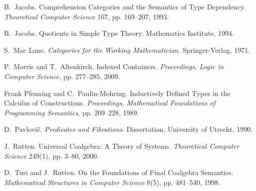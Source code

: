 \documentclass{LMCS}
\theoremstyle{plain}
\theoremstyle{remark}
\theoremstyle{definition}
\begin{document}
\begin{thebibliography}{99999}
B.\ Jacobs. Comprehension Categories and the Semantics of Type
Dependency. {\em Theoretical Computer Science} 107, pp. 169--207,
1993. 

B.\ Jacobs. Quotients in Simple Type Theory. Mathematics
Institute, 1994.  

 S.\ Mac Lane. {\em Categories for the Working
  Mathematician}. Springer-Verlag, 1971.

 P.\ Morris and T.\ Altenkirch.  Indexed
  Containers. {\em Proceedings, Logic in Computer Science},
  pp. 277--285, 2009.

Frank Pfenning and C.\ Paulin-Mohring. 
Inductively Defined Types in the Calculus of Constructions. {\em
  Proceedings, Mathematical Foundations of Programming
  Semantics}, pp. 209--228, 1989. 

D.\ Pavlovi\v{c}. {\em Predicates and Fibrations}. Dissertation,
University of Utrecht, 1990.

 J.\ Rutten. Universal Coalgebra: A Theory of
  Systems. {\em Theoretical Computer Science} 249(1), pp. 3--80, 2000.

D.\ Turi and J.\ Rutten. On the Foundations of Final Coalgebra
Semantics. {\em Mathematical Structures in Computer Science} 8(5),
pp. 481--540, 1998.

\end{thebibliography}
\end{document}
